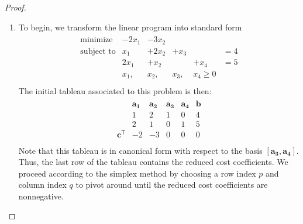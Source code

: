 \documentclass[12pt]{article}
\theoremstyle{definition}
\newcommand{\vc}[1]{\boldsymbol{#1}}
\newcommand{\tran}{\mathsf{T}}
\begin{document}
\begin{proof}
  \begin{enumerate}
    \item To begin, we transform the linear program into standard form
      \begin{align*}
        \begin{array}{rlllll}
          \text{minimize} &-2x_1 &- 3x_2 & & &  \\
          \text{subject to} & x_1 &+ 2x_2 &+ x_3 & &= 4  \\
           & 2x_1 &+ x_2 & &+ x_4 &= 5  \\
           & x_1, &x_2,  &x_3, &x_4 \geq 0 &  \\
        \end{array}
      \end{align*}
      The initial tableau associated to this problem is then:
      \begin{align*}
        \begin{matrix}
          & \vc{a_1} & \vc{a_2} & \vc{a_3} & \vc{a_4} & \vc{b} \\
          & 1 & 2 & 1 & 0 & 4 \\
          & 2 & 1 & 0 & 1 & 5 \\
          \vc{c}^\tran & -2 & -3  & 0 & 0 & 0 \\
        \end{matrix}
      \end{align*}
      Note that this tableau is in canonical form with respect to the basis $[\vc{a_3}, \vc{a_4}]$.
      Thus, the last row of the tableau contains the reduced cost coefficients.
      We proceed according to the simplex method by choosing a row index $p$ and column
      index $q$ to pivot around until the reduced cost coefficients are nonnegative.


\end{enumerate}
\end{proof}
\end{document}
